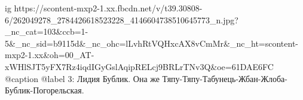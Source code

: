  
 
 
 
 

\ifcmt
  ig https://scontent-mxp2-1.xx.fbcdn.net/v/t39.30808-6/262049278_2784426618523228_4146604738510645773_n.jpg?_nc_cat=103&ccb=1-5&_nc_sid=b9115d&_nc_ohc=lLvhRtVQHxcAX8vCmMr&_nc_ht=scontent-mxp2-1.xx&oh=00_AT-xWHlSJT5yFX7Rz4iqdIGyGslAqipRELcj9BRLrTNv3Q&oe=61DAE6FC
  @caption @label 3: Лидия Бублик. Она же Тяпу-Тяпу-Табунець-Жбан-Жлоба-Бублик-Погорельская.
\fi
